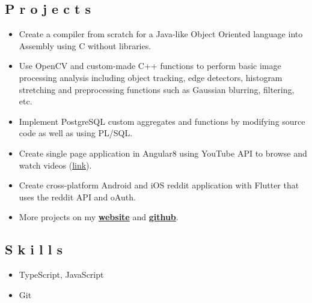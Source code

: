 \documentclass{resume}
\begin{document}

\subsection{P r o j e c t s}
\begin{itemize}
\item \small Create a compiler from scratch for a Java-like Object Oriented language into Assembly using C without libraries.
\item \small Use OpenCV and custom-made C++ functions to perform basic image processing analysis including object tracking, edge detectors, histogram stretching and preprocessing functions such as Gaussian blurring, filtering, etc.
\item \small Implement PostgreSQL custom aggregates and functions by modifying source code as well as using PL/SQL.
\item \small Create single page application in Angular8 using YouTube API to browse and watch videos (\href{https://github.com/mushfiq814/youtube-data-api-dogVids}{link}).
\item \small Create cross-platform Android and iOS reddit application with Flutter that uses the reddit API and oAuth.
\item \small More projects on my \href{https://mushfiqmahmud.com/html/projects}{\textbf{website}} and \href{https://github.com/mushfiq814}{\textbf{github}}.
\end{itemize}


\subsection{S k i l l s}
\begin{itemize}
\item \small TypeScript, JavaScript
\item \small Git
\end{itemize}

\end{document}
